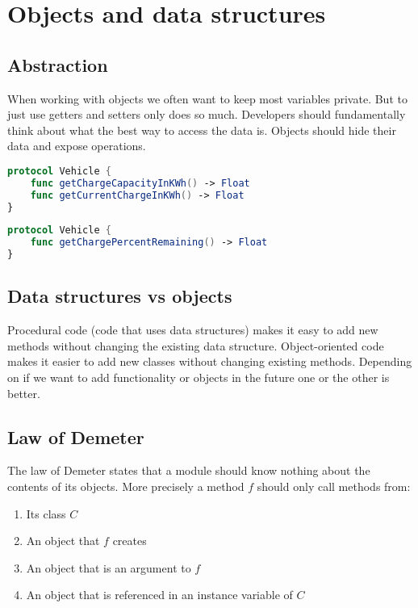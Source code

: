 \section{Objects and data structures}

\subsection{Abstraction}
When working with objects we often want to keep most variables private. But to just use getters and setters only does so much. Developers should fundamentally think about what the best way to access the data is. Objects should hide their data and expose operations.

\begin{lstlisting}[language=Swift, caption={Naive way to expose a vehicles charge}]
protocol Vehicle {
    func getChargeCapacityInKWh() -> Float
    func getCurrentChargeInKWh() -> Float
}
\end{lstlisting}

\begin{lstlisting}[language=Swift, caption={Better way to expose the charge data}]
protocol Vehicle {
    func getChargePercentRemaining() -> Float
}
\end{lstlisting}

\subsection{Data structures vs objects}
Procedural code (code that uses data structures) makes it easy to add new methods without changing the existing data structure. Object-oriented code makes it easier to add new classes without changing existing methods. Depending on if we want to add functionality or objects in the future one or the other is better.

\subsection{Law of Demeter}
The law of Demeter states that a module should know nothing about the contents of its objects. More precisely a method \( f \) should only call methods from:

\begin{enumerate}
\item Its class \( C \)
\item An object that \( f \) creates
\item An object that is an argument to \( f \)
\item An object that is referenced in an instance variable of \( C \)
\end{enumerate}
